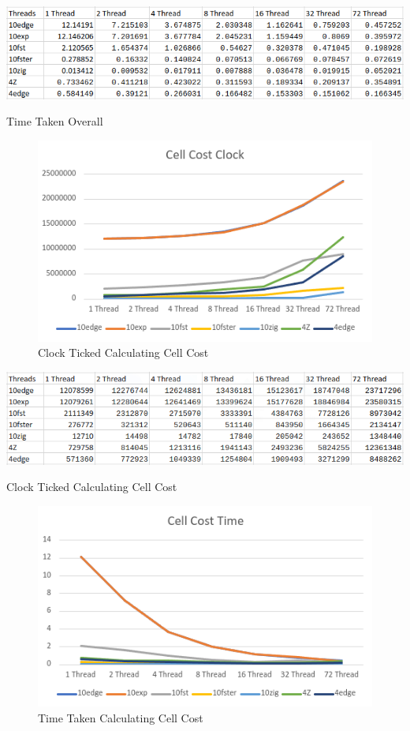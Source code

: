 \documentclass{article}
\begin{document}
\begin{table}[!htb]
\includegraphics[width=\textwidth]{overall-time-table.png}
\caption{Time Taken Overall}
\label{tab:2}
\end{table}

\begin{figure}[!htb]
\includegraphics[width=\textwidth]{cell-cost-clock.png}
\caption{Clock Ticked Calculating Cell Cost}
\label{fig:3}
\end{figure}

\begin{table}[!htb]
\includegraphics[width=\textwidth]{cell-cost-clock-table.png}
\caption{Clock Ticked Calculating Cell Cost}
\label{tab:3}
\end{table}

\begin{figure}[!htb]
\includegraphics[width=\textwidth]{cell-cost-time.png}
\caption{Time Taken Calculating Cell Cost}
\label{fig:4}
\end{figure}
\end{document}
